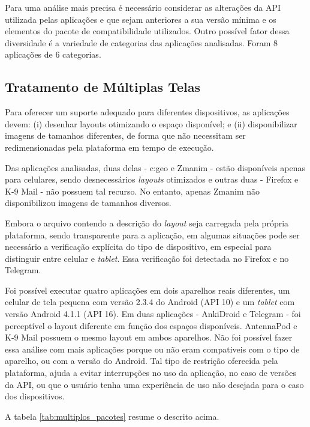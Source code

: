 Para uma análise mais precisa é necessário considerar as alterações da API
utilizada pelas aplicações e que sejam anteriores a sua versão mínima e os
elementos do pacote de compatibilidade utilizados. Outro possível fator dessa
diversidade é a variedade de categorias das aplicações analisadas. Foram 8
aplicações de 6 categorias.

\subsection{Tratamento de Múltiplas Telas}
\label{sec:multiplas_telas}

Para oferecer um suporte adequado para diferentes dispositivos, as aplicações
devem: (i) desenhar layouts otimizando o espaço disponível; e (ii) disponibilizar
imagens de tamanhos diferentes, de forma que não necessitam ser redimensionadas
pela plataforma em tempo de execução.

Das aplicações analisadas, duas delas - c:geo e Zmanim - estão disponíveis apenas
para celulares, sendo desnecessários \textit{layouts} otimizados e outras duas - Firefox
e K-9 Mail - não possuem tal recurso. No entanto, apenas Zmanim não disponibilizou
imagens de tamanhos diversos.

Embora o arquivo contendo a descrição do \textit{layout} seja carregada pela própria
plataforma, sendo transparente para a aplicação, em algumas situações pode ser
necessário a verificação explícita do tipo de dispositivo, em especial para
distinguir entre celular e \textit{tablet}. Essa verificação foi detectada no Firefox
e no Telegram.

Foi possível executar quatro aplicações em dois aparelhos reais diferentes,
um celular de tela pequena com versão 2.3.4 do Android (API 10) e um \textit{tablet} com
versão Android 4.1.1 (API 16). Em duas aplicações - AnkiDroid e Telegram  - foi perceptível
o layout diferente em função dos espaços disponíveis. AntennaPod e K-9 Mail possuem
o mesmo layout em ambos aparelhos. Não foi possível fazer essa análise com mais
aplicações porque ou não eram compativeis com o tipo de aparelho, ou com a versão
do Android. Tal tipo de restrição oferecida pela plataforma, ajuda a evitar
interrupções no uso da aplicação, no caso de versões da API, ou que o usuário
tenha uma experiência de uso não desejada para o caso dos dispositivos.

A tabela \ref{tab:multiplos_pacotes} resume o descrito acima.

